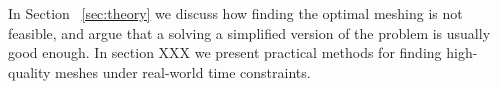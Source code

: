 In Section ~\ref{sec:theory} we discuss how finding the optimal meshing is not feasible, and argue that a solving a simplified version of the problem is usually good enough.  In section XXX we present practical methods for finding high-quality meshes under real-world time constraints.









